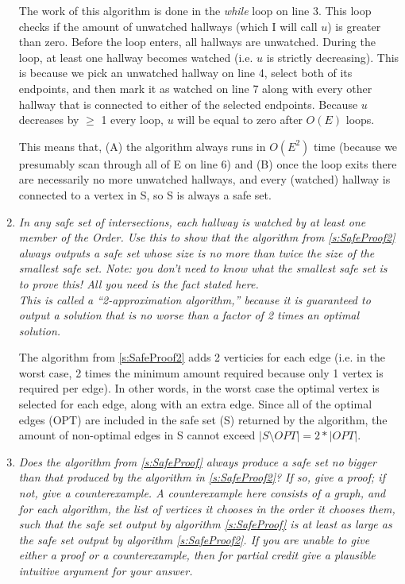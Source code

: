 \documentclass[12pt]{article} \setlength{\oddsidemargin}{0in}
\begin{document}
\begin{enumerate}
The work of this algorithm is done in the \textit{while} loop on line 3. This loop checks if the amount of unwatched hallways (which I will call $u$) is greater than zero. Before the loop enters, all hallways are unwatched. During the loop, at least one hallway becomes watched (i.e. $u$ is strictly decreasing). This is because we pick an unwatched hallway on line 4, select both of its endpoints, and then mark it as watched on line 7 along with every other hallway that is connected to either of the selected endpoints. Because $u$ decreases by $\ge$ 1 every loop, $u$ will be equal to zero after $O(E)$ loops.

This means that, (A) the algorithm always runs in $O(E^2)$ time (because we presumably scan through all of E on line 6) and (B) once the loop exits there are necessarily no more unwatched hallways, and every (watched) hallway is connected to a vertex in S, so S is always a safe set. 

\item\textit{In any safe set of intersections, each hallway is watched by at least one member of the Order. Use this to show that the algorithm from \ref{s:SafeProof2} always outputs a safe set whose size is no more than twice the size of the smallest safe set. Note: you don't need to know what the smallest safe set is to prove this! All you need is the fact stated here.\\
This is called a ``2-approximation algorithm,'' because it is guaranteed to output a solution that is no worse than a factor of 2 times an optimal solution.}

The algorithm from \ref{s:SafeProof2} adds 2 verticies for each edge (i.e. in the worst case, 2 times the minimum amount required because only 1 vertex is required per edge). In other words, in the worst case the optimal vertex is selected for each edge, along with an extra edge. Since all of the optimal edges (OPT) are included in the safe set (S) returned by the algorithm, the amount of non-optimal edges in S cannot exceed $|S \setminus OPT| = 2*|OPT|$. 

\pagebreak

\item\textit{Does the algorithm from \ref{s:SafeProof} always produce a safe set no bigger than that produced by the algorithm in \ref{s:SafeProof2}? If so, give a proof; if not, give a counterexample. A counterexample here consists of a graph, and for each algorithm, the list of vertices it chooses in the order it chooses them, such that the safe set output by algorithm \ref{s:SafeProof} is at least as large as the safe set output by algorithm \ref{s:SafeProof2}. If you are unable to give either a proof or a counterexample, then for partial credit give a plausible intuitive argument for your answer.}


\end{enumerate}
\end{document}

